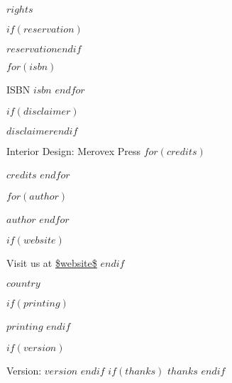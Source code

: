   \par\noindent\emph{\thetitle}\newline
  \par\noindent\emph{$rights$}\newline

  \footnotesize
  $if(reservation)$\par\noindent $reservation$\newline$endif$

  $for(isbn)$
    \par\noindent ISBN $isbn$
  $endfor$\newline

  \footnotesize
  $if(disclaimer)$\par\noindent $disclaimer$\newline$endif$

  \par\noindent Interior Design: Merovex Press %
  $for(credits)$
    \par\noindent $credits$
  $endfor$\newline

  \par $for(author)$
    \par\noindent $author$
    $endfor$\newline

  $if(website)$
    \par\noindent Visit us at \url{$website$}\newline
  $endif$

  \par\noindent $country$
  \newline

  $if(printing)$
    \par\noindent\textit{$printing$}
    \newline
  $endif$

  $if(version)$
  \par\noindent Version: $version$
  $endif$
  \vspace*{\fill}
  \clearpage\normalsize
  $if(thanks)$
    $thanks$
    \newpage
  $endif$
